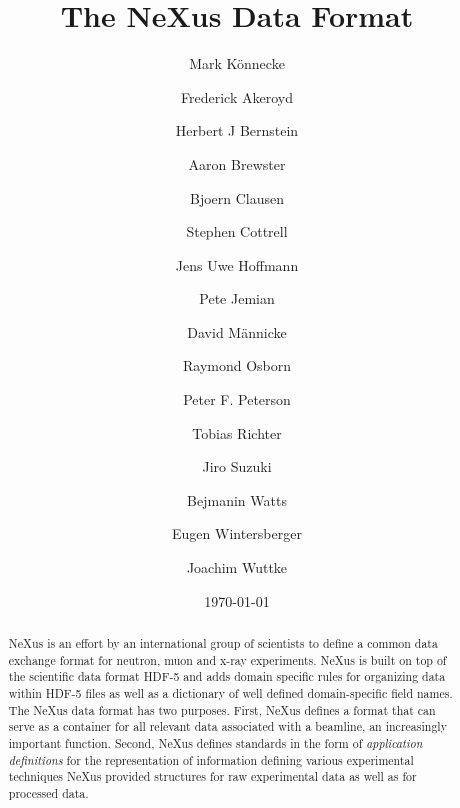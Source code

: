 \documentclass[%
 aip,
rsi,
 amsmath,amssymb,
 reprint,%
]{revtex4-1}
\begin{document}

\title{The NeXus Data Format}


\author{Mark K\"onnecke}
\author{Frederick Akeroyd}

\author{Herbert J Bernstein}

\author{Aaron Brewster}

\author{Bjoern Clausen}

\author{Stephen Cottrell}

\author{Jens Uwe Hoffmann}

\author{Pete Jemian}

\author{David M\"annicke}

\author{Raymond Osborn}

\author{Peter F. Peterson}

\author{Tobias Richter}

\author{Jiro Suzuki}


\author{Bejmanin Watts}

\author{Eugen Wintersberger}

\author{Joachim Wuttke}



\date{\today}%

\begin{abstract}
NeXus is an effort by an international group of scientists to define 
 a common data exchange format for neutron, muon and x-ray experiments.   
NeXus is built on top of the scientific data format HDF-5 and adds domain 
specific rules for organizing data within HDF-5 files as well as a dictionary of well 
defined domain-specific field names. The NeXus data format has two purposes.  First, NeXus defines a
format that can serve as a container for all relevant data associated
with a beamline, an increasingly important function.  Second, NeXus
defines standards in the form of \emph{application definitions} for the
representation of information defining various experimental
techniques NeXus provided structures for raw experimental data as well as for processed data.  
\end{abstract}
\end{document}

